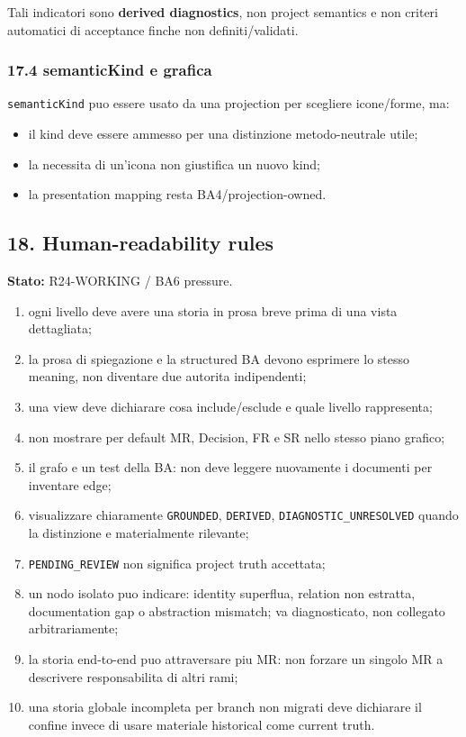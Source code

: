 \documentclass[
  9pt,
  a4paper,
]{article}
\providecommand{\tightlist}{%
  \setlength{\itemsep}{0pt}\setlength{\parskip}{0pt}}
\begin{document}
Tali indicatori sono \textbf{derived diagnostics}, non project semantics
e non criteri automatici di acceptance finche non definiti/validati.

\subsubsection{17.4 semanticKind e
grafica}\label{semantickind-e-grafica}

\texttt{semanticKind} puo essere usato da una projection per scegliere
icone/forme, ma:

\begin{itemize}
\tightlist
\item
  il kind deve essere ammesso per una distinzione metodo-neutrale utile;
\item
  la necessita di un'icona non giustifica un nuovo kind;
\item
  la presentation mapping resta BA4/projection-owned.
\end{itemize}

\subsection{18. Human-readability rules}\label{human-readability-rules}

\textbf{Stato:} R24-WORKING / BA6 pressure.

\begin{enumerate}
\def\labelenumi{\arabic{enumi}.}
\tightlist
\item
  ogni livello deve avere una storia in prosa breve prima di una vista
  dettagliata;
\item
  la prosa di spiegazione e la structured BA devono esprimere lo stesso
  meaning, non diventare due autorita indipendenti;
\item
  una view deve dichiarare cosa include/esclude e quale livello
  rappresenta;
\item
  non mostrare per default MR, Decision, FR e SR nello stesso piano
  grafico;
\item
  il grafo e un test della BA: non deve leggere nuovamente i documenti
  per inventare edge;
\item
  visualizzare chiaramente \texttt{GROUNDED}, \texttt{DERIVED},
  \texttt{DIAGNOSTIC\_UNRESOLVED} quando la distinzione e materialmente
  rilevante;
\item
  \texttt{PENDING\_REVIEW} non significa project truth accettata;
\item
  un nodo isolato puo indicare: identity superflua, relation non
  estratta, documentation gap o abstraction mismatch; va diagnosticato,
  non collegato arbitrariamente;
\item
  la storia end-to-end puo attraversare piu MR: non forzare un singolo
  MR a descrivere responsabilita di altri rami;
\item
  una storia globale incompleta per branch non migrati deve dichiarare
  il confine invece di usare materiale historical come current truth.
\end{enumerate}
\end{document}
